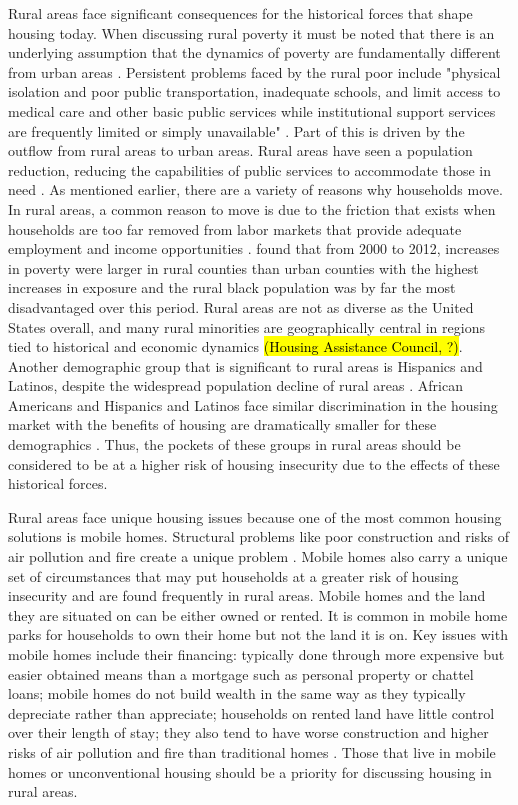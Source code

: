  Rural areas face significant consequences for the historical forces that shape housing today. When discussing rural poverty it must be noted that there is an underlying assumption that the dynamics of poverty are fundamentally different from urban areas \citep{thiede_spatial_2018}. Persistent problems faced by the rural poor include "physical isolation and poor public transportation, inadequate schools, and limit access to medical care and other basic public services while institutional support services are frequently limited or simply unavailable" \citep[?]{lichter_changing_2007}. Part of this is driven by the outflow from rural areas to urban areas. Rural areas have seen a population reduction, reducing the capabilities of public services to accommodate those in need \citep{bjerke_mover_2019}. As mentioned earlier, there are a variety of reasons why households move. In rural areas, a common reason to move is due to the friction that exists when households are too far removed from labor markets that provide adequate employment and income opportunities \citep{sparks_poverty_2013}. \citet{thiede_spatial_2018} found that from 2000 to 2012, increases in poverty were larger in rural counties than urban counties with the highest increases in exposure and the rural black population was by far the most disadvantaged over this period. Rural areas are not as diverse as the United States overall, and many rural minorities are geographically central in regions tied to historical and economic dynamics \hl{(Housing Assistance Council, ?)}. Another demographic group that is significant to rural areas is Hispanics and Latinos, despite the widespread population decline of rural areas \citep{lichter_demographic_2020}. African Americans and Hispanics and Latinos face similar discrimination in the housing market with the benefits of housing are dramatically smaller for these demographics \citep{krivo_housing_2004}. Thus, the pockets of these groups in rural areas should be considered to be at a higher risk of housing insecurity due to the effects of these historical forces. 

 Rural areas face unique housing issues because one of the most common housing solutions is mobile homes. Structural problems like poor construction and risks of air pollution and fire create a unique problem \citep{mactavish_policy_2006}. Mobile homes also carry a unique set of circumstances that may put households at a greater risk of housing insecurity and are found frequently in rural areas. Mobile homes and the land they are situated on can be either owned or rented. It is common in mobile home parks for households to own their home but not the land it is on. Key issues with mobile homes include their financing: typically done through more expensive but easier obtained means than a mortgage such as personal property or chattel loans; mobile homes do not build wealth in the same way as they typically depreciate rather than appreciate; households on rented land have little control over their length of stay; they also tend to have worse construction and higher risks of air pollution and fire than traditional homes \citep{mactavish_wrong_2007}. Those that live in mobile homes or unconventional housing should be a priority for discussing housing in rural areas. %
 
